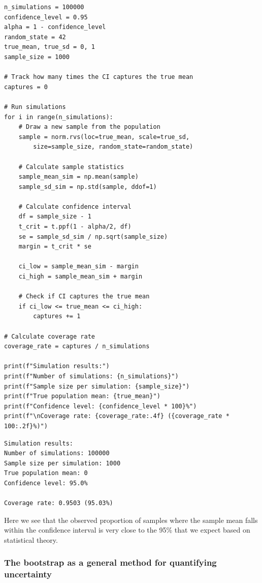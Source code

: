\begin{lstlisting}[style=Python]
n_simulations = 100000
confidence_level = 0.95
alpha = 1 - confidence_level
random_state = 42
true_mean, true_sd = 0, 1
sample_size = 1000

# Track how many times the CI captures the true mean
captures = 0

# Run simulations
for i in range(n_simulations):
    # Draw a new sample from the population
    sample = norm.rvs(loc=true_mean, scale=true_sd, 
        size=sample_size, random_state=random_state)
    
    # Calculate sample statistics
    sample_mean_sim = np.mean(sample)
    sample_sd_sim = np.std(sample, ddof=1)
    
    # Calculate confidence interval
    df = sample_size - 1
    t_crit = t.ppf(1 - alpha/2, df)
    se = sample_sd_sim / np.sqrt(sample_size)
    margin = t_crit * se
    
    ci_low = sample_mean_sim - margin
    ci_high = sample_mean_sim + margin
    
    # Check if CI captures the true mean
    if ci_low <= true_mean <= ci_high:
        captures += 1

# Calculate coverage rate
coverage_rate = captures / n_simulations

print(f"Simulation results:")
print(f"Number of simulations: {n_simulations}")
print(f"Sample size per simulation: {sample_size}")
print(f"True population mean: {true_mean}")
print(f"Confidence level: {confidence_level * 100}%")
print(f"\nCoverage rate: {coverage_rate:.4f} ({coverage_rate * 100:.2f}%)")
\end{lstlisting}

\begin{lstlisting}[style=shell]
Simulation results:
Number of simulations: 100000
Sample size per simulation: 1000
True population mean: 0
Confidence level: 95.0%

Coverage rate: 0.9503 (95.03%)
\end{lstlisting}

Here we see that the observed proportion of samples where the sample mean falls within the confidence interval is very close to the 95\% that we expect based on statistical theory.

\subsubsection{The bootstrap as a general method for quantifying uncertainty}

